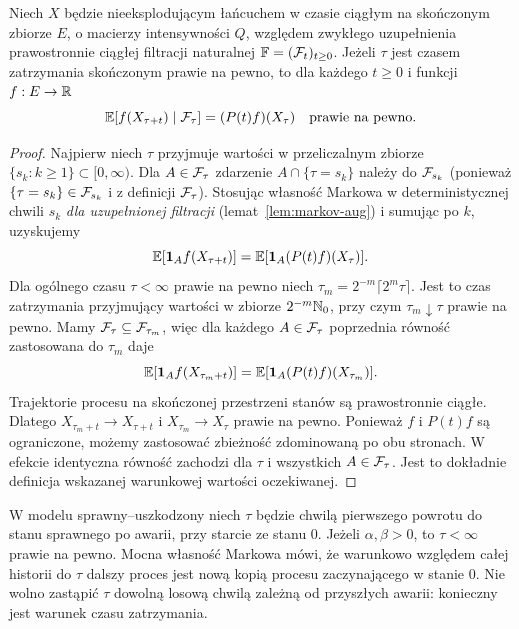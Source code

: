 \begin{twierdzenie}
\label{thm:ctmc-strong}
Niech $X$ będzie nieeksplodującym łańcuchem w czasie
ciągłym na skończonym zbiorze $E$, o macierzy intensywności
$Q$, względem zwykłego uzupełnienia prawostronnie ciągłej
filtracji naturalnej $\mathbb F=(\mathcal{F}_t)_{t\ge0}$.
Jeżeli $\tau$ jest czasem zatrzymania skończonym prawie na
pewno, to dla każdego $t\ge0$ i funkcji $f:E\to\mathbb{R}$
\[
\mathbb{E}[f(X_{\tau+t})\mid\mathcal{F}_\tau]=(P(t)f)(X_\tau)
\quad\text{prawie na pewno}.
\]
\end{twierdzenie}
\begin{proof}
Najpierw niech $\tau$ przyjmuje wartości w przeliczalnym
zbiorze $\{s_k:k\ge1\}\subset[0,\infty)$.
Dla $A\in\mathcal{F}_\tau$ zdarzenie
$A\cap\{\tau=s_k\}$ należy do $\mathcal{F}_{s_k}$
(ponieważ $\{\tau=s_k\}\in\mathcal{F}_{s_k}$ i z definicji
$\mathcal{F}_\tau$).
Stosując własność Markowa w deterministycznej chwili $s_k$
\emph{dla uzupełnionej filtracji} (lemat~\ref{lem:markov-aug})
i sumując po $k$, uzyskujemy
\[
\mathbb{E}[\mathbf{1}_{A} f(X_{\tau+t})]
=\mathbb{E}[\mathbf{1}_{A}(P(t)f)(X_\tau)].
\]
Dla ogólnego czasu $\tau<\infty$ prawie na pewno niech
$\tau_m=2^{-m}\lceil2^m\tau\rceil$.
Jest to czas zatrzymania przyjmujący wartości w zbiorze
$2^{-m}\mathbb{N}_0$, przy czym $\tau_m\downarrow\tau$
prawie na pewno. Mamy $\mathcal{F}_\tau\subseteq\mathcal{F}_{\tau_m}$,
więc dla każdego $A\in\mathcal{F}_\tau$ poprzednia równość
zastosowana do $\tau_m$ daje
\[
\mathbb{E}[\mathbf{1}_{A} f(X_{\tau_m+t})]
=\mathbb{E}[\mathbf{1}_{A}(P(t)f)(X_{\tau_m})].
\]
Trajektorie procesu na skończonej przestrzeni stanów są
prawostronnie ciągłe. Dlatego
$X_{\tau_m+t}\to X_{\tau+t}$ i $X_{\tau_m}\to X_\tau$
prawie na pewno. Ponieważ $f$ i $P(t)f$ są ograniczone,
możemy zastosować zbieżność zdominowaną po obu stronach.
W efekcie identyczna równość zachodzi dla $\tau$ i wszystkich
$A\in\mathcal{F}_\tau$. Jest to dokładnie definicja wskazanej
warunkowej wartości oczekiwanej.
\end{proof}

\begin{przyklad}
W modelu sprawny--uszkodzony niech $\tau$ będzie chwilą
pierwszego powrotu do stanu sprawnego po awarii, przy starcie
ze stanu $0$. Jeżeli $\alpha,\beta>0$, to $\tau<\infty$
prawie na pewno. Mocna własność Markowa mówi, że warunkowo
względem całej historii do $\tau$ dalszy proces jest
nową kopią procesu zaczynającego w stanie $0$.
Nie wolno zastąpić $\tau$ dowolną losową chwilą zależną
od przyszłych awarii: konieczny jest warunek czasu zatrzymania.
\end{przyklad}


